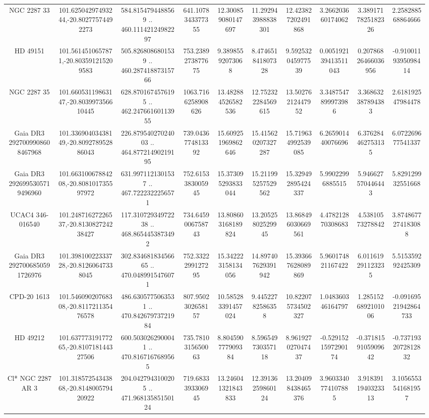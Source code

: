 \begin{table}
\begin{tabular}{cccccccccc}
NGC  2287    33 & 101.62504297493244,-20.80277574492273 & 584.8154794488569 .. 460.11142124982297 & 641.1078343377355 & 12.300859080147697 & 11.292943988838301 & 12.423827202491868 & 3.266203660174062 & 3.3891717825182326 & 2.258288568864666 \\
HD  49151 & 101.5614510657871,-20.803591215209583 & 505.8268086801539 .. 460.28741887315766 & 753.2389273877675 & 9.38985592073068 & 8.474651841807328 & 9.592532045977539 & 0.005192139413511043 & 0.20786826466036956 & -0.9100119395098414 \\
NGC  2287    35 & 101.66053119863147,-20.803997356610445 & 628.8701674576195 .. 462.24766160113955 & 1063.7166258908626 & 13.482884526582536 & 12.752322284569615 & 13.50276212447952 & 3.3487547899973986 & 3.368632387894383 & 2.618192547984478 \\
Gaia DR3 2927009908608467968 & 101.33690403438149,-20.809278952886043 & 226.87954027024003 .. 464.87721490219195 & 739.0436774813392 & 15.609251969862646 & 15.415620207327287 & 15.719634992539085 & 6.265901440076696 & 6.376284462753135 & 6.072269677541337 \\
Gaia DR3 2926995305719496960 & 101.66310067884208,-20.808101735597972 & 631.9971121301537 .. 467.7222322256571 & 752.6153383005945 & 15.373095293833044 & 15.211995257529562 & 15.329492895424337 & 5.99022996885515 & 5.946627570446443 & 5.829129932551668 \\
UCAC4 346-016540 & 101.24871627226537,-20.813082724238427 & 117.31072934972238 .. 468.8654453873492 & 734.6459006758743 & 13.808603168189824 & 13.20525802529945 & 13.868496030669561 & 4.478212870308683 & 4.53810573278842 & 3.8748677274183088 \\
Gaia DR3 2927006850591726976 & 101.39810022333728,-20.81260647338045 & 302.83468183456665 .. 470.0489915476071 & 752.3322299127295 & 15.342223158134056 & 14.897407629391942 & 15.393667628089869 & 5.960174821167422 & 6.011619291123235 & 5.515359292425309 \\
CPD-20  1613 & 101.54609020768308,-20.811721135476578 & 486.6305775063531 .. 470.84267973721984 & 807.9502302658157 & 10.585283391457024 & 9.44522782586358 & 10.822075734502327 & 1.048360346164797 & 1.2851526892101006 & -0.09169521942864733 \\
HD  49212 & 101.63777319177265,-20.810718144327506 & 600.5030262900041 .. 470.8167167689565 & 735.7810315650063 & 8.804590777909384 & 8.596549730357118 & 8.961927027047437 & -0.5291521597290174 & -0.3718159105909642 & -0.7371932072812832 \\
Cl* NGC 2287     AR       3 & 101.31857254343868,-20.814800579420922 & 204.0427943100205 .. 471.96813585150124 & 719.6833393306945 & 13.246041321843833 & 12.39136259860124 & 13.204098438465376 & 3.9603340774107885 & 3.9183911940323313 & 3.1056553541681957 \\

\end{tabular}
\end{table}
